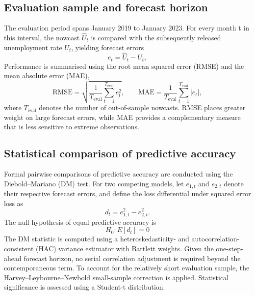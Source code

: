 \documentclass[12pt,a4paper]{article}
\begin{document}
\subsection{Evaluation sample and forecast horizon}
The evaluation period spans January 2019 to January 2023. For every month t in this interval, the nowcast
$\widehat{U}_t$ is compared with the subsequently released unemployment rate $U_t$, yielding forecast errors
\begin{equation}
    e_t = \widehat{U}_t - U_t,
\end{equation}
Performance is summarised using the root mean squared error (RMSE) and the mean absolute error (MAE),
\begin{equation}
    \text{RMSE} = \sqrt{\frac{1}{T_{\text{eval}}} \sum_{t=1}^{T_{\text{eval}}} e_{t}^2}, \qquad 
    \text{MAE} = \frac{1}{T_{\text{eval}}} \sum_{t=1}^{T_{\text{eval}}} |e_t|,
\end{equation}
where $T_{\text{eval}}$ denotes the number of out-of-sample nowcasts. RMSE places greater weight on large forecast errors,
while MAE provides a complementary measure that is less sensitive to extreme observations.



\subsection{Statistical comparison of predictive accuracy}
Formal pairwise comparisons of predictive accuracy are conducted using the Diebold–Mariano (DM) test. For two competing models,
let $e_{1,t}$ and $e_{2,t}$ denote their respective forecast errors, and define the loss differential under squared error loss as
\begin{equation}
     d_t = e_{1,t}^2 - e_{2,t}^2.
\end{equation}
The null hypothesis of equal predictive accuracy is
\begin{equation}
    H_0: E[d_t] = 0
\end{equation}
The DM statistic is computed using a heteroskedasticity- and autocorrelation-consistent (HAC) variance estimator with Bartlett weights. Given the one-step-ahead forecast horizon, no serial correlation adjustment is required beyond the contemporaneous term. To account for the relatively short evaluation sample, the Harvey–Leybourne–Newbold small-sample correction is applied. Statistical significance is assessed using a Student-t distribution. 
\end{document}
